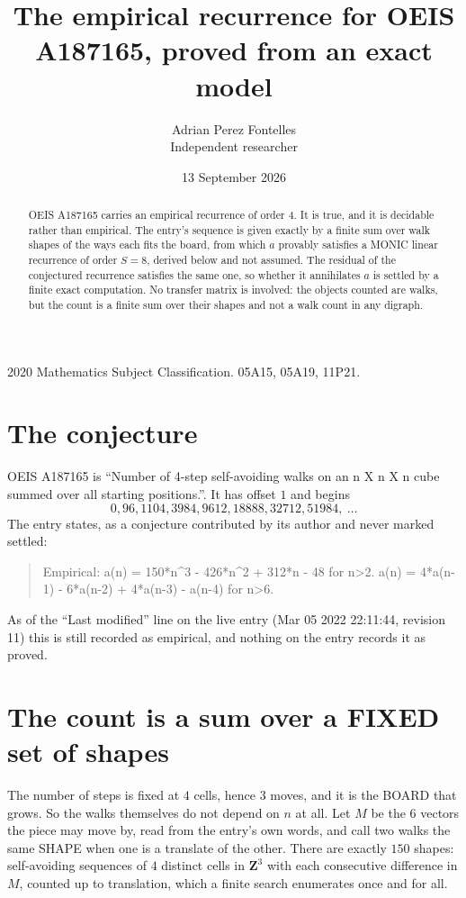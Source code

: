 \documentclass[11pt,a4paper]{article}
\title{The empirical recurrence for OEIS A187165, proved from an exact model}
\author{Adrian Perez Fontelles\\ \small Independent researcher}
\date{13 September 2026}
\theoremstyle{plain}
\theoremstyle{definition}
\begin{document}
\maketitle

\begin{abstract}
OEIS A187165 carries an empirical recurrence of order $4$. It is true, and it is
decidable rather than empirical. The entry's sequence is given exactly by a finite sum over walk shapes of the ways each fits the board, from
which $a$ provably satisfies a MONIC linear recurrence of order $S=8$, derived below and not
assumed. The residual of the conjectured recurrence satisfies the same one, so whether it
annihilates $a$ is settled by a finite exact computation. No transfer matrix is involved: the objects counted are walks, but the count is a finite sum over their shapes and not a walk count in any digraph.
\end{abstract}

\noindent\small 2020 Mathematics Subject Classification. 05A15, 05A19, 11P21.\normalsize

\section{The conjecture}

OEIS A187165 is ``Number of 4-step self-avoiding walks on an n X n X n cube summed over all starting positions.''. It has offset $1$ and begins
\[
0, 96, 1104, 3984, 9612, 18888, 32712, 51984,\ \dots
\]
The entry states, as a conjecture contributed by its author and never marked settled:
\begin{quote}
Empirical: a(n) = 150*n\^{}3 - 426*n\^{}2 + 312*n - 48 for n>2. a(n) = 4*a(n-1) - 6*a(n-2) + 4*a(n-3) - a(n-4) for n>6.
\end{quote}
As of the ``Last modified'' line on the live entry (Mar 05 2022 22:11:44, revision 11)
this is still recorded as empirical, and nothing on the entry records it as proved.

\section{The count is a sum over a FIXED set of shapes}

The number of steps is fixed at $4$ cells, hence $3$ moves, and it is the BOARD
that grows. So the walks themselves do not depend on $n$ at all. Let $M$ be the $6$
vectors the piece may move by, read from the entry's own words, and call two walks the same
SHAPE when one is a translate of the other. There are exactly $150$ shapes: self-avoiding
sequences of $4$ distinct cells in $\mathbf{Z}^{3}$ with each consecutive difference in
$M$, counted up to translation, which a finite search enumerates once and for all.
\end{document}
